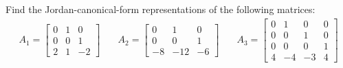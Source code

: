 \item Find the Jordan-canonical-form representations of the following matrices:
\begin{align*}
A_1 = \begin{bmatrix}
        0 & 1 & 0\\
        0 & 0 & 1\\
        2 & 1 & -2
       \end{bmatrix}
& \quad
A_2 = \begin{bmatrix}
        0 & 1 & 0\\
        0 & 0 & 1\\
        -8 & -12 & -6
       \end{bmatrix}
& \quad
A_3 = \begin{bmatrix}
        0 & 1 & 0 & 0 \\
        0 & 0 & 1 & 0 \\
        0 & 0 & 0 & 1 \\
        4 & -4 & -3 & 4
       \end{bmatrix}
\end{align*}
